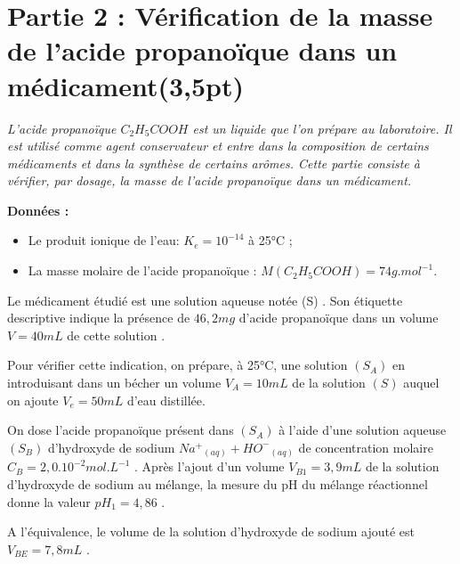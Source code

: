 \documentclass[12pt]{article}
\begin{document}
 \section*{Partie 2 : Vérification de la masse de l’acide propanoïque dans un médicament\dotfill(3,5pt) }
\emph{L’acide propanoïque $C_2H_5COOH$ est un liquide que l’on prépare au laboratoire. Il est utilisé comme
agent conservateur et entre dans la composition de certains médicaments et dans la synthèse de certains
arômes.
Cette partie consiste à vérifier, par dosage, la masse de l’acide propanoïque dans un médicament.}

\textbf{Données : } 

\begin{itemize}
  \item Le produit ionique de l’eau: $K_e =10^{-14}$ à 25°C ;
  \item La masse molaire de l’acide propanoïque : $M(C_2H_5COOH) = 74 g.mol^{-1}$.

\end{itemize}


Le médicament étudié est une solution aqueuse notée (S) . Son étiquette descriptive indique la présence
de $46,2 mg$ d’acide propanoïque dans un volume $V = 40 mL$ de cette solution .

Pour vérifier cette indication, on prépare, à 25°C, une solution $(S_A)$ en introduisant dans un bécher un
volume $V_A =10 mL$ de la solution $(S)$ auquel on ajoute $V_e = 50 mL$ d’eau distillée.

On dose l’acide propanoïque présent dans $(S_A)$ à l’aide d’une solution aqueuse $(S_B)$ d’hydroxyde de
sodium ${Na^+}_{(aq)} + {HO^-}_{(aq)}$
 de concentration molaire $C_B = 2,0.10^{-2} mol.L^{-1}$ .
Après l’ajout d’un volume $V_{B1} = 3,9 mL$ de la solution d’hydroxyde de sodium au mélange, la mesure du pH du mélange réactionnel donne la valeur $pH_1=4,86$ .

A l’équivalence, le volume de la solution d’hydroxyde de sodium ajouté est $V_{BE} = 7,8 mL$ .

\vspace{0.5cm}
\end{document}
